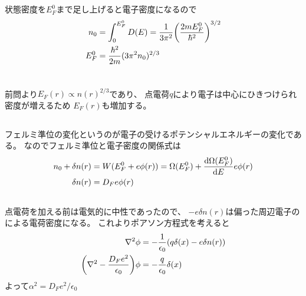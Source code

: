 \documentclass[../../master.tex]{subfiles}
\begin{document}
\subsection{}
状態密度を\(E_F^0\)まで足し上げると電子密度になるので
\begin{align}
    n_0 &= \int_{0}^{E_F^0} D(E) = \frac{1}{3\pi^2}\qty(\frac{2mE_F^0}{\hbar^2})^{3/2}\\
    E_F^0 &=\frac{\hbar^2}{2m}(3\pi^2n_0)^{2/3}
\end{align}

\section{}
\subsection{}
前問より\(E_F(r)\propto n(r)^{2/3}\)であり、
点電荷\(q\)により電子は中心にひきつけられ密度が増えるため
\(E_F(r)\)も増加する。
\subsection{}
フェルミ準位の変化というのが電子の受けるポテンシャルエネルギーの変化である。
なのでフェルミ準位と電子密度の関係式は
\begin{align}
    n_0+\delta n(r) &= W(E_F^0+e\phi(r)) = \Omega(E_F^0) +\dv{\Omega(E_F^0)}{E}e\phi(r)\\
    \delta n(r) &= D_Fe\phi(r)
\end{align}

\subsection{}
点電荷を加える前は電気的に中性であったので、
\(-e\delta n(r)\)は偏った周辺電子のによる電荷密度になる。
これよりポアソン方程式を考えると
\begin{align}
    \laplacian \phi &= -\frac{1}{\epsilon_0}\qty(q\delta(x) - e\delta n(r))\\
    \qty(\laplacian - \frac{D_F e^2}{\epsilon_0})\phi &= -\frac{q}{\epsilon_0}\delta(x)
\end{align}
よって\(\alpha^2=D_Fe^2/\epsilon_0\)
\end{document}
